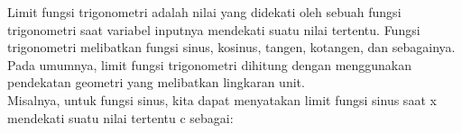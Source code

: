 \documentclass[a4paper,10pt]{article}
\begin{document}
\begin{eulernotebook}
\begin{eulercomment}
\begin{eulercomment}
\begin{eulercomment}
\begin{eulercomment}
\begin{eulercomment}
\begin{eulercomment}
\begin{eulercomment}
\begin{eulercomment}
\begin{eulercomment}
\begin{eulercomment}
\begin{eulercomment}
Limit fungsi trigonometri adalah nilai yang didekati oleh sebuah
fungsi trigonometri saat variabel inputnya mendekati suatu nilai
tertentu. Fungsi trigonometri melibatkan fungsi sinus, kosinus,
tangen, kotangen, dan sebagainya. Pada umumnya, limit fungsi
trigonometri dihitung dengan menggunakan pendekatan geometri yang
melibatkan lingkaran unit.\\
Misalnya, untuk fungsi sinus, kita dapat menyatakan limit fungsi sinus
saat x mendekati suatu nilai tertentu c sebagai:


\end{eulercomment}
\end{eulercomment}
\end{eulercomment}
\end{eulercomment}
\end{eulercomment}
\end{eulercomment}
\end{eulercomment}
\end{eulercomment}
\end{eulercomment}
\end{eulercomment}
\end{eulercomment}
\end{eulernotebook}
\end{document}
